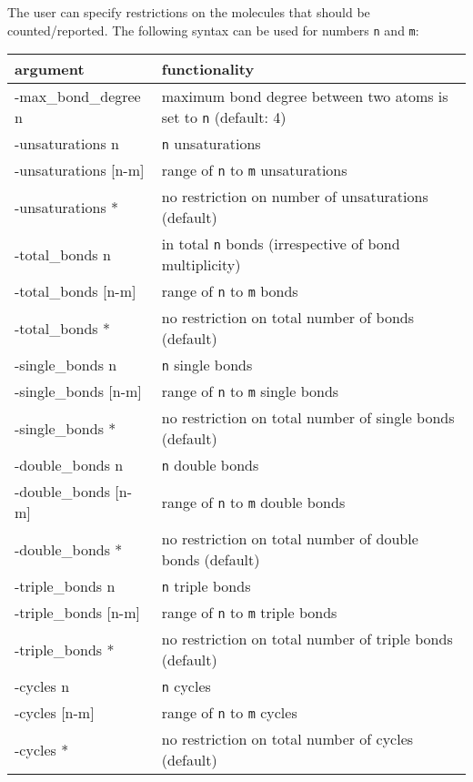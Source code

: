 \documentclass[a4paper,11pt]{article}
\begin{document}
The user can specify restrictions on the molecules that should be counted/reported. The following syntax can be used for numbers \texttt{n} and \texttt{m}:

\begin{table}[H]
\begin{tabular}{>{\ttfamily\raggedright}p{}|p{}}
    \hline
    \textnormal{argument} & functionality \\
    \hline\hline
    -max\_bond\_degree n& maximum bond degree between two atoms is set to \texttt{n} (default: 4)\\
    \hline
    -unsaturations n & \texttt{n} unsaturations \\
    -unsaturations [n-m] & range of \texttt{n} to \texttt{m} unsaturations \\
    -unsaturations * & no restriction on number of unsaturations (default)\\
    \hline
    -total\_bonds n & in total \texttt{n} bonds (irrespective of bond multiplicity) \\
    -total\_bonds [n-m] & range of \texttt{n} to \texttt{m} bonds \\
    -total\_bonds * & no restriction on total number of bonds (default)\\
    \hline
    -single\_bonds n & \texttt{n} single bonds \\
    -single\_bonds [n-m] & range of \texttt{n} to \texttt{m} single bonds \\
    -single\_bonds * & no restriction on total number of single bonds (default)\\
    \hline
    -double\_bonds n & \texttt{n} double bonds \\
    -double\_bonds [n-m] & range of \texttt{n} to \texttt{m} double bonds \\
    -double\_bonds * & no restriction on total number of double bonds (default)\\
    \hline
    -triple\_bonds n & \texttt{n} triple bonds \\
    -triple\_bonds [n-m] & range of \texttt{n} to \texttt{m} triple bonds \\
    -triple\_bonds * & no restriction on total number of triple bonds (default)\\
    \hline
    -cycles n & \texttt{n} cycles \\
    -cycles [n-m] & range of \texttt{n} to \texttt{m} cycles \\
    -cycles * & no restriction on total number of cycles (default)\\
    \hline
\end{tabular}
\end{table}
\end{document}
